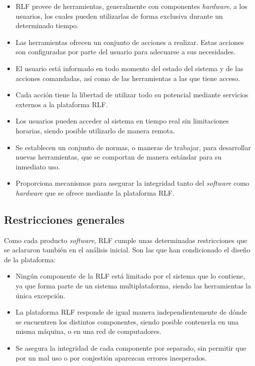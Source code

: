 \begin{itemize}
\item RLF provee de herramientas, generalmente con componentes 
\emph{hardware}, a los usuarios, los cuales pueden utilizarlas de 
forma exclusiva durante un determinado tiempo.
\item Las herramientas ofrecen un conjunto de acciones a realizar. 
Estas acciones son configuradas por parte del usuario para adecuarse a 
sus necesidades.
\item El usuario está informado en todo momento del estado del 
sistema y de las acciones comandadas, así como de las herramientas a 
las que tiene acceso.
\item Cada acción tiene la libertad de utilizar todo su potencial 
mediante servicios externos a la plataforma RLF.
\item Los usuarios pueden acceder al sistema en tiempo real sin limitaciones 
horarias, siendo posible utilizarlo de manera remota.
\item Se establecen un conjunto de normas, o maneras de trabajar, para 
desarrollar nuevas herramientas, que se comportan de manera estándar 
para su inmediato uso.
\item Proporciona mecanismos para asegurar la integridad tanto del 
\emph{software} como \emph{hardware} que se ofrece mediante la 
plataforma RLF.
\end{itemize}

\subsection{Restricciones generales}
Como cada producto \emph{software}, RLF cumple unas determinadas 
restricciones que se aclararon también en el análisis inicial. Son 
las que han condicionado el diseño de la plataforma:

\begin{itemize}
\item Ningún componente de la RLF está limitado por el 
sistema que lo contiene, ya que forma parte de un sistema 
multiplataforma, siendo las herramientas la única excepción.
\item La plataforma RLF responde de igual manera independientemente de 
dónde se encuentren los distintos componentes, siendo posible 
contenerla en una misma máquina, o en una red de computadores.
\item Se asegura la integridad de cada componente por separado, sin 
permitir que por un mal uso o por conjestión aparezcan errores 
inesperados.
\end{itemize}

